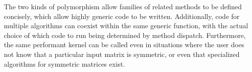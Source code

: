 The two kinds of polymorphism allow families of related methods to be defined
concisely, which allow highly generic code to be written. Additionally, code for
multiple algorithms can coexist within the same generic function, with the actual
choice of which code to run being determined by method dispatch. Furthermore,
the same performant kernel can be called even in situations where the user does
not know that a particular input matrix is symmetric, or even that specialized
algorithms for symmetric matrices exist.

